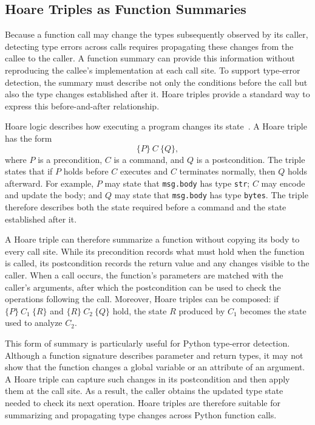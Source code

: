 \subsection{Hoare Triples as Function Summaries}
\label{sec:hoare-background}

Because a function call may change the types subsequently observed by its
caller, detecting type errors across calls requires propagating these
changes from the callee to the caller. A function summary can provide this
information without reproducing the callee's implementation at each call
site. To support type-error detection, the summary must describe not only
the conditions before the call but also the type changes established after
it. Hoare triples provide a standard way to express this before-and-after
relationship.

Hoare logic describes how executing a program changes its
state~\cite{hoare1969axiomatic,softwareFoundationsHoare}. A Hoare triple has
the form
\begin{equation}
\{P\}\ C\ \{Q\},
\label{eq:hoare-triple}
\end{equation}
where $P$ is a precondition, $C$ is a command, and $Q$ is a postcondition.
The triple states that if $P$ holds before $C$ executes and $C$ terminates
normally, then $Q$ holds afterward. For example, $P$ may state that
\texttt{msg.body} has type \texttt{str}; $C$ may encode and update the body;
and $Q$ may state that \texttt{msg.body} has type \texttt{bytes}. The triple
therefore describes both the state required before a command and the state
established after it.

A Hoare triple can therefore summarize a function without copying its body
to every call site. While its precondition records what must hold when the
function is called, its postcondition records the return value and any
changes visible to the caller. When a call occurs, the function's parameters
are matched with the caller's arguments, after which the postcondition can
be used to check the operations following the call. Moreover, Hoare triples
can be composed: if $\{P\}\ C_1\ \{R\}$ and $\{R\}\ C_2\ \{Q\}$ hold, the
state $R$ produced by $C_1$ becomes the state used to analyze $C_2$.

This form of summary is particularly useful for Python type-error detection.
Although a function signature describes parameter and return types, it may
not show that the function changes a global variable or an attribute of an
argument. A Hoare triple can capture such changes in its postcondition and
then apply them at the call site. As a result, the caller obtains the updated
type state needed to check its next operation. Hoare triples are therefore
suitable for summarizing and propagating type changes across Python function
calls.


